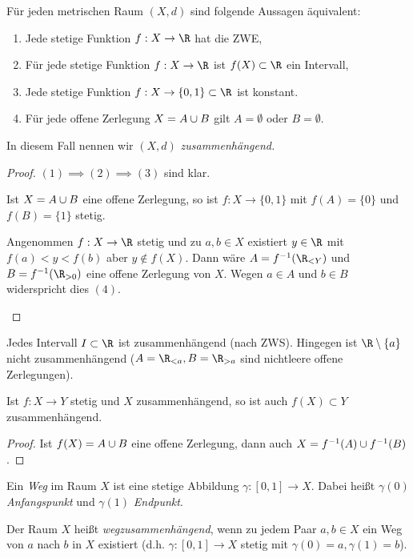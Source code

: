 \begin{st}
	Für jeden metrischen Raum $(X,d)$ sind folgende Aussagen äquivalent:
	\begin{enumerate}[(1)]
		\item
			Jede stetige Funktion $f: X \to \R$ hat die ZWE,
		\item
			Für jede stetige Funktion $f: X \to \R$ ist $f(X) \subset \R$ ein Intervall,
		\item
			Jede stetige Funktion $f: X \to \{0,1\} \subset \R$ ist konstant.
		\item
			Für jede offene Zerlegung $X = A \cup B$ gilt $A = \emptyset$ oder $B = \emptyset$.
	\end{enumerate}
	In diesem Fall nennen wir $(X,d)$ \em{zusammenhängend}.
	\begin{proof}
		$(1) \implies (2) \implies (3)$ sind klar.
		\begin{seg}[$(3) \implies (4)$]
			Ist $X = A \cup B$ eine offene Zerlegung, so ist \oBdA $f: X \to \{0, 1\}$ mit $f(A) = \{0\}$ und $f(B) = \{1\}$ stetig.
		\end{seg}
		\begin{seg}[$(4) \implies (1)$]
			Angenommen $f: X \to \R$ stetig und zu $a,b \in X$ existiert $y \in \R$ mit $f(a) < y < f(b)$ aber $y \not\in f(X)$.
			Dann wäre $A = f^{-1}(\R_{<Y})$ und $B = f^{-1}(\R_{>0})$ eine offene Zerlegung von $X$.
			Wegen $a \in A$ und $b \in B$ widerspricht dies $(4)$.
		\end{seg}
	\end{proof}
\end{st}

\begin{ex}
	Jedes Intervall $I \subset \R$ ist zusammenhängend (nach ZWS).
	Hingegen ist $\R \setminus \{a\}$ nicht zusammenhängend ($A = \R_{<a}, B=\R_{>a}$ sind nichtleere offene Zerlegungen).
\end{ex}

\begin{st}
	Ist $f: X \to Y$ stetig und $X$ zusammenhängend, so ist auch $f(X) \subset Y$ zusammenhängend.
	\begin{proof}
		Ist $f(X) = A \cup B$ eine offene Zerlegung, dann auch $X = f^{-1}(A) \cup f^{-1}(B)$.
	\end{proof}
\end{st}

\begin{df}
	Ein \emph{Weg} im Raum $X$ ist eine stetige Abbildung $\gamma: [0,1] \to X$.
	Dabei heißt $\gamma(0)$ \emph{Anfangspunkt} und $\gamma(1)$ \emph{Endpunkt}.

	Der Raum $X$ heißt \emph{wegzusammenhängend}, wenn zu jedem Paar $a,b \in X$ ein Weg von $a$ nach $b$ in $X$ existiert (d.h. $\gamma:[0,1] \to X$ stetig mit $\gamma(0) = a, \gamma(1) = b$).
\end{df}

